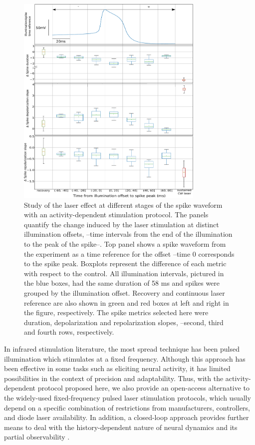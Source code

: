 \begin{figure}[htb!]
	\centering
	\includegraphics[width=0.8\textwidth]{img/laser/Figure6.pdf}
	\caption{Study of the laser effect at different stages of the spike waveform with an activity-dependent stimulation protocol. The panels quantify the change induced by the laser stimulation at distinct illumination offsets, --time intervals from the end of the illumination to the peak of the spike--. Top panel shows a spike waveform from the experiment as a time reference for the offset --time 0 corresponds to the spike peak. Boxplots represent the difference of each metric with respect to the control. All illumination intervals, pictured in the blue boxes, had the same duration of 58 ms and spikes were grouped by the illumination offset. Recovery and continuous laser reference are also shown in green and red boxes at left and right in the figure, respectively. The spike metrics selected here were duration, depolarization and repolarization slopes, --second, third and fourth rows, respectively.}
	\label{fig:activity dependent}
\end{figure}

In infrared stimulation literature, the most spread technique has been pulsed illumination which stimulates at a fixed frequency. Although this approach has been effective in some tasks such as eliciting neural activity, it has limited possibilities in the context of precision and adaptability. Thus, with the activity-dependent protocol proposed here, we also provide an open-access alternative to the widely-used fixed-frequency pulsed laser stimulation protocols, which usually depend on a specific combination of restrictions from manufacturers, controllers, and diode laser availability. In addition, a closed-loop approach provides further means to deal with the history-dependent nature of neural dynamics and its partial observability \parencite{varona_online_2016}. 


